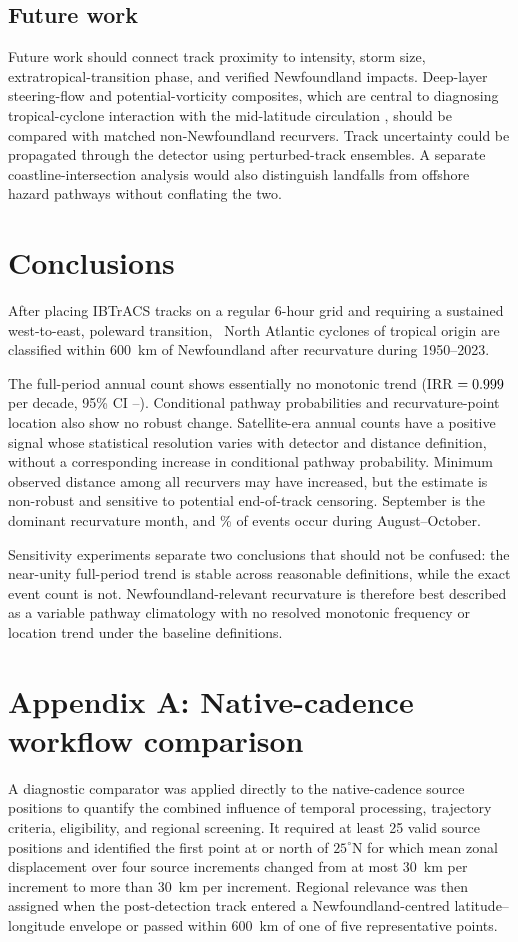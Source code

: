 \documentclass[11pt]{article}
\begin{document}
\subsection{Future work}
Future work should connect track proximity to intensity, storm size, extratropical-transition phase, and verified Newfoundland impacts. Deep-layer steering-flow and potential-vorticity composites, which are central to diagnosing tropical-cyclone interaction with the mid-latitude circulation \citep{Jones2003,Keller2019}, should be compared with matched non-Newfoundland recurvers. Track uncertainty could be propagated through the detector using perturbed-track ensembles. A separate coastline-intersection analysis would also distinguish landfalls from offshore hazard pathways without conflating the two.

\section{Conclusions}
After placing IBTrACS tracks on a regular 6-hour grid and requiring a sustained west-to-east, poleward transition, \BaselineN\ North Atlantic cyclones of tropical origin are classified within 600~km of Newfoundland after recurvature during 1950--2023.

The full-period annual count shows essentially no monotonic trend (IRR \(=0.999\) per decade, 95\% CI \FullCILow--\FullCIHigh). Conditional pathway probabilities and recurvature-point location also show no robust change. Satellite-era annual counts have a positive signal whose statistical resolution varies with detector and distance definition, without a corresponding increase in conditional pathway probability. Minimum observed distance among all recurvers may have increased, but the estimate is non-robust and sensitive to potential end-of-track censoring. September is the dominant recurvature month, and \AugOctPct\% of events occur during August--October.

Sensitivity experiments separate two conclusions that should not be confused: the near-unity full-period trend is stable across reasonable definitions, while the exact event count is not. Newfoundland-relevant recurvature is therefore best described as a variable pathway climatology with no resolved monotonic frequency or location trend under the baseline definitions.

\section*{Appendix A: Native-cadence workflow comparison}
A diagnostic comparator was applied directly to the native-cadence source positions to quantify the combined influence of temporal processing, trajectory criteria, eligibility, and regional screening. It required at least 25 valid source positions and identified the first point at or north of \(25^\circ\)N for which mean zonal displacement over four source increments changed from at most 30~km per increment to more than 30~km per increment. Regional relevance was then assigned when the post-detection track entered a Newfoundland-centred latitude--longitude envelope or passed within 600~km of one of five representative points.
\end{document}
